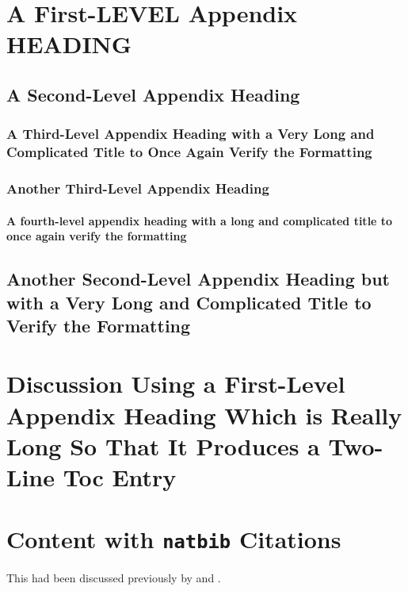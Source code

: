 


\section{A First-LEVEL Appendix HEADING}
\lipsum[7-9]

\subsection{A Second-Level Appendix Heading}
\lipsum[10]
\subsubsection{A Third-Level Appendix Heading with a Very Long and
  Complicated Title to Once Again Verify the Formatting}
\lipsum[10-12]
\subsubsection{Another Third-Level Appendix Heading}
\lipsum[10-12]
\paragraph{A fourth-level appendix heading with a long and complicated title
to once again verify the formatting}
\lipsum[13-15]

\subsection{Another Second-Level Appendix Heading but with a
Very Long and Complicated Title to Verify the Formatting}
\lipsum[13-15]

\section{Discussion Using a First-Level Appendix Heading
  Which is Really Long So That It Produces a Two-Line
  Toc Entry}
\lipsum[10-12]


\section{Content with \texttt{natbib} Citations}

This had been discussed previously by \citep{bullwinkle.1990} and
\citet{winkle.1991}. \lipsum[22-25]


\endinput
